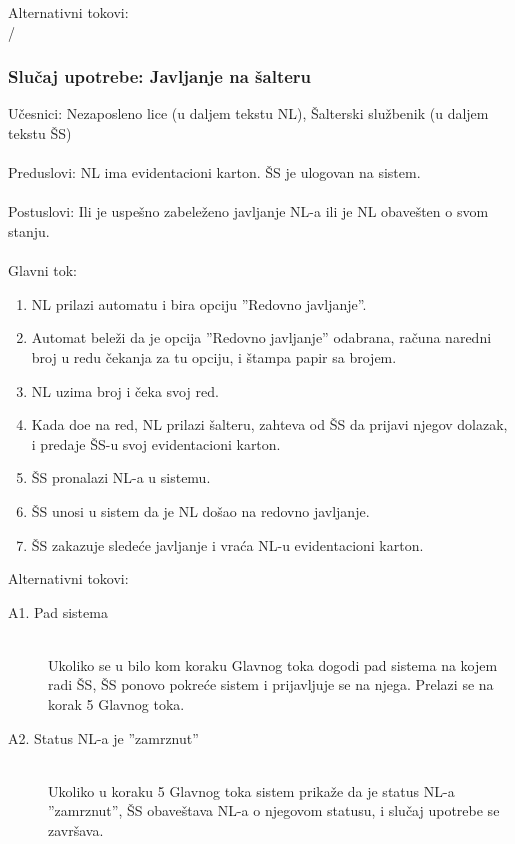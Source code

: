 \noindent Alternativni tokovi: 
\\/

\subsubsection{Slu\v caj upotrebe: Javljanje na \v salteru}
\label{su: javljanje na salteru}

\noindent U\v cesnici: Nezaposleno lice (u daljem tekstu NL), \v Salterski slu\v zbenik (u daljem tekstu \v SS)
\\
\\ Preduslovi: NL ima evidentacioni karton. \v SS je ulogovan na sistem. 
\\
\\ Postuslovi: Ili je uspe\v sno zabele\v zeno javljanje NL-a ili je NL obave\v sten o svom stanju.
\\ 
\\ Glavni tok:
\begin{enumerate}
	\item NL prilazi automatu i bira opciju ''Redovno javljanje''.
	\item Automat bele\v zi da je opcija ''Redovno javljanje'' odabrana, ra\v cuna naredni broj u redu \v cekanja za tu opciju, i \v stampa papir sa brojem.
	\item NL uzima broj i \v ceka svoj red.
	\item Kada do\dj e na red, NL prilazi \v salteru, zahteva od \v SS da prijavi njegov dolazak, i predaje \v SS-u svoj evidentacioni karton.
	\item \v SS pronalazi NL-a u sistemu.
	\item \v SS unosi u sistem da je NL do\v sao na redovno javljanje.
	\item \v SS zakazuje slede\' ce javljanje i vra\' ca NL-u evidentacioni karton.
\end{enumerate}

\noindent Alternativni tokovi: 
\begin{description}
	\item[A1. Pad sistema] ~\\
	Ukoliko se u bilo kom koraku Glavnog toka dogodi pad sistema na kojem radi \v SS, \v SS ponovo pokre\'ce sistem i prijavljuje se na njega. Prelazi se na korak 5 Glavnog toka.
	
	\item[A2. Status NL-a je ''zamrznut''] ~\\
	Ukoliko u koraku 5 Glavnog toka sistem prika\v ze da je status NL-a ''zamrznut'', \v SS obave\v stava NL-a o njegovom statusu, i slu\v caj upotrebe se zavr\v sava.
\end{description}

